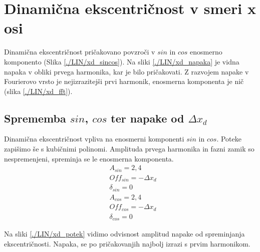 \section{Dinamična ekscentričnost v smeri x osi}
%
Dinamična ekscentričnost pričakovano povzroči v $sin$ in $cos$ enosmerno komponento (Slika \ref{./LIN/xd_sincos}).
 Na sliki \ref{./LIN/xd_napaka} je vidna napaka v obliki prvega harmonika, kar je bilo pričakovati.
Z razvojem napake v Fourierovo vrsto je nejizrazitejši prvi harmonik, enosmerna komponenta je nič (slika \ref{./LIN/xd_fft}).


\newpage
\subsection{Sprememba $sin$, $cos$ ter napake od $\Delta x_d$}
Dinamična ekscentričnost vpliva na enosmerni komponenti $sin$ in $cos$.
Poteke zapišimo še s kubičnimi polinomi. Amplituda prvega harmonika in fazni zamik so nespremenjeni, spreminja se le enosmerna komponenta.
\begin{eqnarray}
\label{analog_lin_xd}
&A_{sin} = 2,4\\
&Off_{sin} = -\Delta x_d \\
&\delta_{sin} =0 \\
&A_{cos} = 2,4\\
&Off_{cos} = -\Delta x_d\\
&\delta_{cos} = 0
\end{eqnarray}

Na sliki \ref{./LIN/xd_potek} vidimo odvisnost amplitud napake od spreminjanja ekscentričnosti. Napaka, se po pričakovanjih najbolj izrazi s prvim harmonikom.

